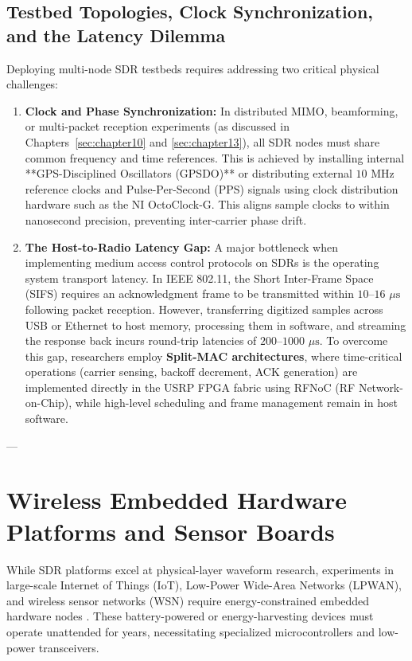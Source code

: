 \subsection{Testbed Topologies, Clock Synchronization, and the Latency Dilemma}
Deploying multi-node SDR testbeds requires addressing two critical physical challenges:
\begin{enumerate}
    \item \textbf{Clock and Phase Synchronization:} In distributed MIMO, beamforming, or multi-packet reception experiments (as discussed in Chapters~\ref{sec:chapter10} and \ref{sec:chapter13}), all SDR nodes must share common frequency and time references. This is achieved by installing internal **GPS-Disciplined Oscillators (GPSDO)** or distributing external $10\text{~MHz}$ reference clocks and Pulse-Per-Second (PPS) signals using clock distribution hardware such as the NI OctoClock-G. This aligns sample clocks to within nanosecond precision, preventing inter-carrier phase drift.
    \item \textbf{The Host-to-Radio Latency Gap:} A major bottleneck when implementing medium access control protocols on SDRs is the operating system transport latency. In IEEE 802.11, the Short Inter-Frame Space (SIFS) requires an acknowledgment frame to be transmitted within $10\text{--}16\text{~}\mu\text{s}$ following packet reception. However, transferring digitized samples across USB or Ethernet to host memory, processing them in software, and streaming the response back incurs round-trip latencies of $200\text{--}1000\text{~}\mu\text{s}$. To overcome this gap, researchers employ \textbf{Split-MAC architectures}, where time-critical operations (carrier sensing, backoff decrement, ACK generation) are implemented directly in the USRP FPGA fabric using RFNoC (RF Network-on-Chip), while high-level scheduling and frame management remain in host software.
\end{enumerate}

---

\section{Wireless Embedded Hardware Platforms and Sensor Boards}
\label{sec:embedded_boards}

While SDR platforms excel at physical-layer waveform research, experiments in large-scale Internet of Things (IoT), Low-Power Wide-Area Networks (LPWAN), and wireless sensor networks (WSN) require energy-constrained embedded hardware nodes \cite{kumar2008wireless, dunkels2004contiki}. These battery-powered or energy-harvesting devices must operate unattended for years, necessitating specialized microcontrollers and low-power transceivers.

